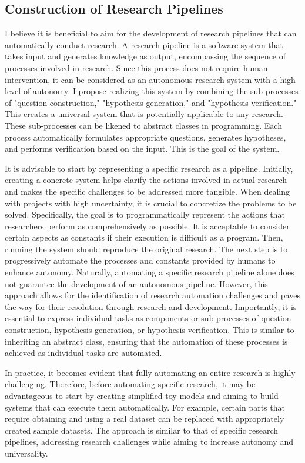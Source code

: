 \documentclass{book}
\begin{document}
\subsection{Construction of Research Pipelines}

I believe it is beneficial to aim for the development of research pipelines that can automatically conduct research. A research pipeline is a software system that takes input and generates knowledge as output, encompassing the sequence of processes involved in research. Since this process does not require human intervention, it can be considered as an autonomous research system with a high level of autonomy. I propose realizing this system by combining the sub-processes of "question construction," "hypothesis generation," and "hypothesis verification." This creates a universal system that is potentially applicable to any research. These sub-processes can be likened to abstract classes in programming. Each process automatically formulates appropriate questions, generates hypotheses, and performs verification based on the input. This is the goal of the system.

It is advisable to start by representing a specific research as a pipeline. Initially, creating a concrete system helps clarify the actions involved in actual research and makes the specific challenges to be addressed more tangible. When dealing with projects with high uncertainty, it is crucial to concretize the problems to be solved. Specifically, the goal is to programmatically represent the actions that researchers perform as comprehensively as possible. It is acceptable to consider certain aspects as constants if their execution is difficult as a program. Then, running the system should reproduce the original research. The next step is to progressively automate the processes and constants provided by humans to enhance autonomy. Naturally, automating a specific research pipeline alone does not guarantee the development of an autonomous pipeline. However, this approach allows for the identification of research automation challenges and paves the way for their resolution through research and development. Importantly, it is essential to express individual tasks as components or sub-processes of question construction, hypothesis generation, or hypothesis verification. This is similar to inheriting an abstract class, ensuring that the automation of these processes is achieved as individual tasks are automated.

In practice, it becomes evident that fully automating an entire research is highly challenging. Therefore, before automating specific research, it may be advantageous to start by creating simplified toy models and aiming to build systems that can execute them automatically. For example, certain parts that require obtaining and using a real dataset can be replaced with appropriately created sample datasets. The approach is similar to that of specific research pipelines, addressing research challenges while aiming to increase autonomy and universality.
\end{document}
